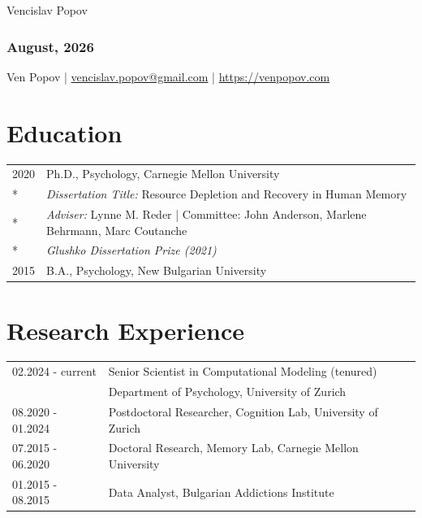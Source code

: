 \documentclass[letterpaper]{article}
\def\name{Vencislav Popov}
\begin{document}
{\huge \name}

\subsubsection*{August, 2026}
\begin{minipage}{0.80\linewidth}
  Ven Popov  | \href{mailto:vencislav.popov@gmail.com}{vencislav.popov@gmail.com} | \url{https://venpopov.com} \\
\end{minipage}

\section*{Education}

\begin{tabular}{ll}
  2020 & Ph.D., Psychology, Carnegie Mellon University                                              \\*
  & {\it Dissertation Title:}  Resource Depletion and Recovery in Human Memory                 \\*
  & {\it Adviser:} Lynne M. Reder | Committee: John Anderson, Marlene Behrmann, Marc Coutanche \\*
  & {\it Glushko Dissertation Prize (2021)}                                                    \\[6pt]
  2015 & B.A., Psychology, New Bulgarian University                                                 \\
\end{tabular}

\section*{Research Experience}

\begin{tabular}{ll}
  02.2024 - current & Senior Scientist in Computational Modeling (tenured)         \\
  & Department of Psychology, University of Zurich               \\[6pt]
  08.2020 - 01.2024 & Postdoctoral Researcher, Cognition Lab, University of Zurich \\[6pt]
  07.2015 - 06.2020 & Doctoral Research, Memory Lab, Carnegie Mellon University    \\[6pt]
  01.2015 - 08.2015 & Data Analyst, Bulgarian Addictions Institute                 \\
\end{tabular}
\end{document}
